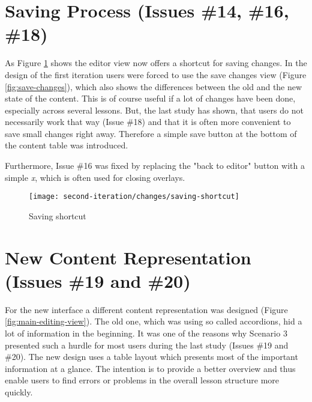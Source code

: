 \section{Saving Process (Issues \#14, \#16, \#18)}
As Figure \ref{fig:saving-shortcut} shows the editor view now offers a shortcut for saving changes. In the design of the first iteration users were forced to use the save changes view (Figure \ref{fig:save-changes}), which also shows the differences between the old and the new state of the content. This is of course useful if a lot of changes have been done, especially across several lessons. But, the last study has shown, that users do not necessarily work that way (Issue \#18) and that it is often more convenient to save small changes right away. Therefore a simple save button at the bottom of the content table was introduced.

Furthermore, Issue \#16 was fixed by replacing the "back to editor" button with a simple \emph{x}, which is often used for closing overlays. 

\begin{figure}[h!]
 \centering
 \texttt{[image: second-iteration/changes/saving-shortcut]}
 \caption{Saving shortcut}
 \label{fig:saving-shortcut}
\end{figure}

\section{New Content Representation (Issues \#19 and \#20)}
For the new interface a different content representation was designed (Figure \ref{fig:main-editing-view}). The old one, which was using so called accordions, hid a lot of information in the beginning. It was one of the reasons why Scenario 3 presented such a hurdle for most users during the last study (Issues \#19 and \#20). The new design uses a table layout which presents most of the important information at a glance. The intention is to provide a better overview and thus enable users to find errors or problems in the overall lesson structure more quickly.


